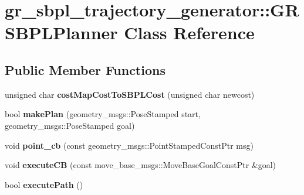 \hypertarget{classgr__sbpl__trajectory__generator_1_1GRSBPLPlanner}{}\section{gr\+\_\+sbpl\+\_\+trajectory\+\_\+generator\+:\+:G\+R\+S\+B\+P\+L\+Planner Class Reference}
\label{classgr__sbpl__trajectory__generator_1_1GRSBPLPlanner}
\subsection*{Public Member Functions}
\begin{DoxyCompactItemize}
\item 
\mbox{\label{classgr__sbpl__trajectory__generator_1_1GRSBPLPlanner_a74c44dce2e6cc0ba2638e69fee037240}} 
unsigned char {\bfseries cost\+Map\+Cost\+To\+S\+B\+P\+L\+Cost} (unsigned char newcost)
\item 
\mbox{\label{classgr__sbpl__trajectory__generator_1_1GRSBPLPlanner_a62f3abfb02b63ad5f86c2a01b4804f22}} 
bool {\bfseries make\+Plan} (geometry\+\_\+msgs\+::\+Pose\+Stamped start, geometry\+\_\+msgs\+::\+Pose\+Stamped goal)
\item 
\mbox{\label{classgr__sbpl__trajectory__generator_1_1GRSBPLPlanner_a62e7982c686bf2b232789399bb71a1ec}} 
void {\bfseries point\+\_\+cb} (const geometry\+\_\+msgs\+::\+Point\+Stamped\+Const\+Ptr msg)
\item 
\mbox{\label{classgr__sbpl__trajectory__generator_1_1GRSBPLPlanner_a2491c5d67e909546c09fa3c9c5966749}} 
void {\bfseries execute\+CB} (const move\+\_\+base\+\_\+msgs\+::\+Move\+Base\+Goal\+Const\+Ptr \&goal)
\item 
\mbox{\label{classgr__sbpl__trajectory__generator_1_1GRSBPLPlanner_a736f1960b6dfbeb1e554e590e25a80dc}} 
bool {\bfseries execute\+Path} ()
\item 
\mbox{\label{classgr__sbpl__trajectory__generator_1_1GRSBPLPlanner_ab0c9d8baa6c27ce771d2d8fa630882e1}} 

\end{DoxyCompactItemize}
